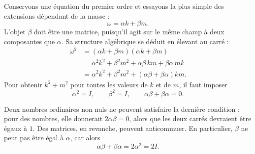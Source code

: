Conservons une équation du premier ordre et essayons la plus simple des extensions dépendant de la masse :
\begin{equation}
\omega=\alpha k+\beta m.
\end{equation}
L’objet \(\beta\) doit être une matrice, puisqu’il agit sur le même champ à deux composantes que \(\alpha\). Sa structure algébrique se déduit en élevant au carré :
\begin{align}
\omega^2
&=(\alpha k+\beta m)(\alpha k+\beta m)\\
&=\alpha^2k^2+\beta^2m^2
+\alpha\beta\,km+\beta\alpha\,mk\\
&=\alpha^2k^2+\beta^2m^2
+(\alpha\beta+\beta\alpha)km.
\end{align}
Pour obtenir \(k^2+m^2\) pour toutes les valeurs de \(k\) et de \(m\), il faut imposer
\begin{equation}
\alpha^2=I,
\qquad
\beta^2=I,
\qquad
\alpha\beta+\beta\alpha=0.
\end{equation}

Deux nombres ordinaires non nuls ne peuvent satisfaire la dernière condition : pour des nombres, elle donnerait \(2\alpha\beta=0\), alors que les deux carrés devraient être égaux à \(1\). Des matrices, en revanche, peuvent anticommuer. En particulier, \(\beta\) ne peut pas être égal à \(\alpha\), car alors
\begin{equation}
\alpha\beta+\beta\alpha=2\alpha^2=2I.
\end{equation}

